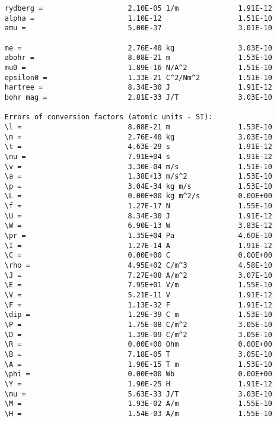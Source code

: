 \documentclass[12pt,a4paper]{article}
\begin{document}
\begin{verbatim}
     rydberg =                    2.10E-05 1/m              1.91E-12
     alpha =                      1.10E-12                  1.51E-10
     amu =                        5.00E-37                  3.01E-10

     me =                         2.76E-40 kg               3.03E-10
     abohr =                      8.08E-21 m                1.53E-10
     mu0 =                        1.89E-16 N/A^2            1.51E-10
     epsilon0 =                   1.33E-21 C^2/Nm^2         1.51E-10
     hartree =                    8.34E-30 J                1.91E-12
     bohr mag =                   2.81E-33 J/T              3.03E-10

     Errors of conversion factors (atomic units - SI):
     \l =                         8.08E-21 m                1.53E-10
     \m =                         2.76E-40 kg               3.03E-10
     \t =                         4.63E-29 s                1.91E-12
     \nu =                        7.91E+04 s                1.91E-12
     \v =                         3.30E-04 m/s              1.51E-10
     \a =                         1.38E+13 m/s^2            1.53E-10
     \p =                         3.04E-34 kg m/s           1.53E-10
     \L =                         0.00E+00 kg m^2/s         0.00E+00
     \f =                         1.27E-17 N                1.55E-10
     \U =                         8.34E-30 J                1.91E-12
     \W =                         6.90E-13 W                3.83E-12
     \pr =                        1.35E+04 Pa               4.60E-10
     \I =                         1.27E-14 A                1.91E-12
     \C =                         0.00E+00 C                0.00E+00
     \rho =                       4.95E+02 C/m^3            4.58E-10
     \J =                         7.27E+08 A/m^2            3.07E-10
     \E =                         7.95E+01 V/m              1.55E-10
     \V =                         5.21E-11 V                1.91E-12
     \F =                         1.13E-32 F                1.91E-12
     \dip =                       1.29E-39 C m              1.53E-10
     \P =                         1.75E-08 C/m^2            3.05E-10
     \D =                         1.39E-09 C/m^2            3.05E-10
     \R =                         0.00E+00 Ohm              0.00E+00
     \B =                         7.18E-05 T                3.05E-10
     \A =                         1.90E-15 T m              1.53E-10
     \phi =                       0.00E+00 Wb               0.00E+00
     \Y =                         1.90E-25 H                1.91E-12
     \mu =                        5.63E-33 J/T              3.03E-10
     \M =                         1.93E-02 A/m              1.55E-10
     \H =                         1.54E-03 A/m              1.55E-10


\end{verbatim}
\end{document}
